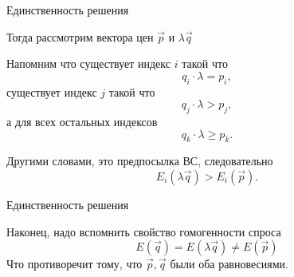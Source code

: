 \documentclass{beamer}
\begin{document}
\begin{frame}{Единственность решения}

Тогда рассмотрим вектора цен $\vec p$ и $\lambda \vec q$

Напомним что существует индекс $i$ такой что
$$ q_i \cdot \lambda = p_i,$$
\pause существует индекс $j$ такой что
$$ q_j \cdot \lambda > p_j,$$
\pause а для всех остальных индексов
$$ q_k \cdot \lambda \geqslant p_k.$$

\pause Другими словами, это предпосылка ВС, следовательно $$ E_i (\lambda \vec q) > E_i(\vec p).$$
\end{frame}

\begin{frame}{Единственность решения}

Наконец, надо вспомнить свойство гомогенности спроса
$$ E(\vec q) = E(\lambda \vec q) \neq E(\vec p)$$
Что противоречит тому, что $\vec p, \vec q$ были оба равновесиями.

\end{frame}
\end{document}
